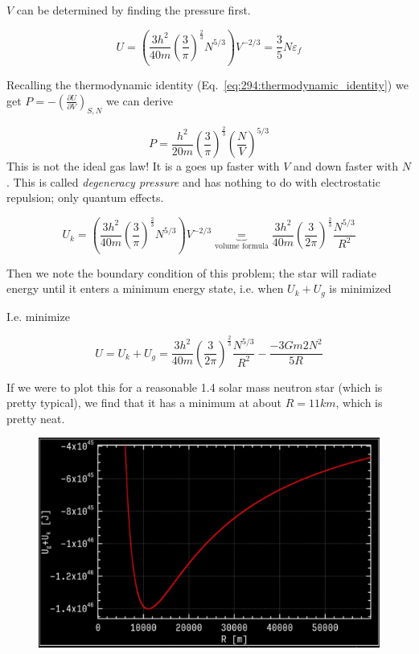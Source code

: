 \documentclass[10pt]{article}
\begin{document}
\begin{example}
	$ V $ can be determined by finding the pressure first.

	\begin{equation}
	 U =	\left( \frac{3h^2}{40m} (\frac{3}{\pi })^{\frac{2}{3}} N^{5 /3} \right) V^{- 2 /3} = \frac{3}{5} N \varepsilon_f 
	\end{equation}

	Recalling the thermodynamic identity (Eq.~\ref{eq:294:thermodynamic_identity}) we get $ P = -(\frac{\partial U}{\partial V} )_{S, N} $  we can derive

	\begin{equation}
		P = \frac{h^2}{20m} (\frac{3}{\pi})^{\frac{2}{3}} (\frac{N}{V})^{5 /3} 
	\end{equation}
	This is not the ideal gas law! 
	It is a goes up faster with $ V $ and down faster with $ N $. This is called \textit{degeneracy pressure}  and has nothing to do with electrostatic repulsion; only quantum effects.
	
	\begin{equation}
		U_k =	\left( \frac{3h^2}{40m} (\frac{3}{\pi })^{\frac{2}{3}} N^{5 /3} \right) V^{- 2 /3} \underbrace{=}_{\text{volume formula}} 
	 \frac{3h^2}{40m} (\frac{3}{2\pi })^{\frac{2}{3}} \frac{N^{5 /3}}{R^2}
	\end{equation}

	Then we note the boundary condition of this problem; the star will radiate energy until it enters a minimum energy state, i.e. when $ U_k + U_g $ is minimized 

	I.e. minimize


	\begin{equation}
		U = U_k + U_g = 
	 \frac{3h^2}{40m} (\frac{3}{2\pi })^{\frac{2}{3}} \frac{N^{5 /3}}{R^2} - \frac{-3Gm2N^2}{5R} 
	\end{equation}


	If we were to plot this for a reasonable 1.4 solar mass neutron star (which is pretty typical), we find that it has a minimum at about $ R = 11 km$, which is pretty neat. 

	\begin{figure}[H]
		\centering
		\includegraphics[width=0.8\linewidth]{img/294_neutron_plot.png}
	\end{figure}


\end{example}
\end{document}
